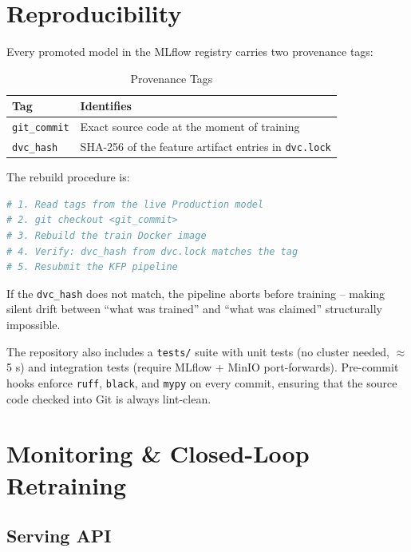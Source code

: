 \documentclass[11pt,a4paper]{article}
\begin{document}
\section{Reproducibility}

Every promoted model in the MLflow registry carries two provenance tags:

\begin{table}[H]
\centering
\begin{tabular}{@{}ll@{}}
\toprule
\textbf{Tag} & \textbf{Identifies} \\
\midrule
\texttt{git\_commit} & Exact source code at the moment of training \\
\texttt{dvc\_hash}   & SHA-256 of the feature artifact entries in \texttt{dvc.lock} \\
\bottomrule
\end{tabular}
\caption{Provenance Tags}
\label{tab:provenance}
\end{table}

The rebuild procedure is:

\begin{lstlisting}[language=bash]
# 1. Read tags from the live Production model
# 2. git checkout <git_commit>
# 3. Rebuild the train Docker image
# 4. Verify: dvc_hash from dvc.lock matches the tag
# 5. Resubmit the KFP pipeline
\end{lstlisting}

If the \texttt{dvc\_hash} does not match, the pipeline aborts before training -- making silent drift between ``what was trained'' and ``what was claimed'' structurally impossible.

The repository also includes a \texttt{tests/} suite with unit tests (no cluster needed, $\approx$5 s) and integration tests (require MLflow + MinIO port-forwards). Pre-commit hooks enforce \texttt{ruff}, \texttt{black}, and \texttt{mypy} on every commit, ensuring that the source code checked into Git is always lint-clean.

\section{Monitoring \& Closed-Loop Retraining}

\subsection{Serving API}
\end{document}

